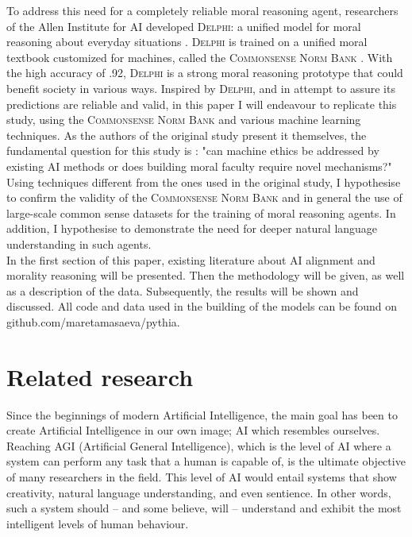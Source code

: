 \documentclass[final]{clv3} %
\begin{document}
To address this need for a completely reliable moral reasoning agent, researchers of the Allen Institute for AI developed \textsc{Delphi}: a unified model for moral reasoning about everyday situations \cite{jiang}. \textsc{Delphi} is trained on a unified moral textbook customized for machines, called the \textsc{Commonsense Norm Bank} \cite{jiang}. With the high accuracy of .92, \textsc{Delphi} is a strong moral reasoning prototype that could benefit society in various ways. Inspired by \textsc{Delphi}, and in attempt to assure its predictions are reliable and valid, in this paper I will endeavour to replicate this study, using the \textsc{Commonsense Norm Bank} and various machine learning techniques. As the authors of the original study present it themselves, the fundamental question for this study is : "can machine ethics be addressed by existing AI methods or does building moral faculty require novel mechanisms?" \cite[p. 2]{jiang}  Using techniques different from the ones used in the original study, I hypothesise to confirm the validity of the \textsc{Commonsense Norm Bank} and in general the use of large-scale common sense datasets for the training of moral reasoning agents. In addition, I hypothesise to demonstrate the need for deeper natural language understanding in such agents.\\

In the first section of this paper, existing literature about AI alignment and morality reasoning will be presented. Then the methodology will be given, as well as a description of the data. Subsequently, the results will be shown and discussed. All code and data used in the building of the models can be found on github.com/maretamasaeva/pythia.

\section{Related research}
Since the beginnings of modern Artificial Intelligence, the main goal has been to create Artificial Intelligence in our own image; AI which resembles ourselves. Reaching AGI (Artificial General Intelligence), which is the level of AI where a system can perform any task that a human is capable of, is the ultimate objective of many researchers in the field. This level of AI would entail systems that show creativity, natural language understanding, and even sentience. In other words, such a system should – and some believe, will – understand and exhibit the most intelligent levels of human behaviour. \\
\end{document}
